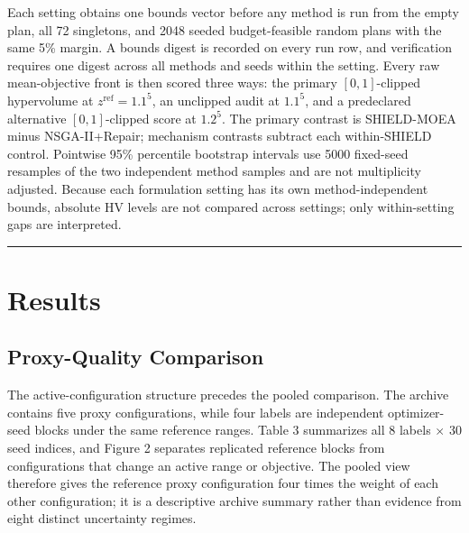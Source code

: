 \documentclass[energies,article,submit,moreauthors]{Definitions/mdpi}
\begin{document}
Each setting obtains one bounds vector before any method is run from the empty plan, all 72 singletons, and 2048 seeded budget-feasible random plans with the same 5\% margin. A bounds digest is recorded on every run row, and verification requires one digest across all methods and seeds within the setting. Every raw mean-objective front is then scored three ways: the primary \([0,1]\)-clipped hypervolume at \(z^{\mathrm{ref}}=1.1^5\), an unclipped audit at \(1.1^5\), and a predeclared alternative \([0,1]\)-clipped score at \(1.2^5\). The primary contrast is SHIELD-MOEA minus NSGA-II+Repair; mechanism contrasts subtract each within-SHIELD control. Pointwise 95\% percentile bootstrap intervals use 5000 fixed-seed resamples of the two independent method samples and are not multiplicity adjusted. Because each formulation setting has its own method-independent bounds, absolute HV levels are not compared across settings; only within-setting gaps are interpreted.

\begin{center}\rule{0.5\linewidth}{0.5pt}\end{center}

\section{Results}\label{results}

\subsection{Proxy-Quality Comparison}\label{proxy-quality-comparison}

The active-configuration structure precedes the pooled comparison. The archive contains five proxy configurations, while four labels are independent optimizer-seed blocks under the same reference ranges. Table 3 summarizes all 8 labels \(\times\) 30 seed indices, and Figure 2 separates replicated reference blocks from configurations that change an active range or objective. The pooled view therefore gives the reference proxy configuration four times the weight of each other configuration; it is a descriptive archive summary rather than evidence from eight distinct uncertainty regimes.
\end{document}
